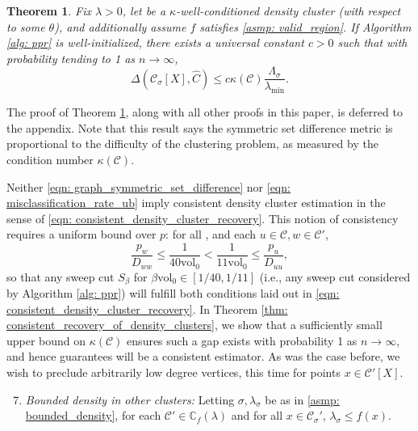 \documentclass{article}
\newcommand{\vol}{\mathrm{vol}}
\newcommand{\1}{\mathbf{1}}
\newcommand{\pbf}{p}        %
\newcommand{\Xbf}{X}             %
\newcommand{\Dbf}{D}
\newcommand{\Cbb}{\mathbb{C}}
\newcommand{\Cset}{\mathcal{C}}
\newcommand{\Csig}{\Cset_{\sigma}}
\newcommand{\Cest}{\widehat{C}}
\theoremstyle{aldenthm}
\newtheorem{theorem}{Theorem}
\theoremstyle{aldenrmrk}
\begin{document}
\begin{theorem}
  \label{thm: misclassification_rate}
  Fix $\lambda > 0$, let \smash{$\Cset \in \Cbb_f(\lambda)$} be a
  $\kappa$-well-conditioned density cluster (with respect to some $\theta$), and
  additionally assume $f$ satisfies \ref{asmp: valid_region}. If Algorithm
  \ref{alg: ppr} is well-initialized, there exists a universal constant $c >
  0$ such that with probability tending to 1 as $n \to \infty$,  
  \begin{equation}
    \label{eqn: misclassification_rate_ub}
    \Delta(\Csig[\Xbf], \Cest) \leq c \kappa(\Cset)
    \frac{\Lambda_{\sigma}}{\lambda_{\min}}. 
  \end{equation}
\end{theorem}

The proof of Theorem \ref{thm: misclassification_rate}, along with all other
proofs in this paper, is deferred to the appendix. Note that this 
result says the symmetric set difference metric \smash{$\Delta(\Csig[\Xbf],
  \Cest)$} is proportional to the difficulty of the clustering problem, as
measured by the condition number $\kappa(\Cset)$. 

Neither \eqref{eqn: graph_symmetric_set_difference} nor \eqref{eqn:
  misclassification_rate_ub} imply consistent density cluster estimation in the 
sense of \eqref{eqn: consistent_density_cluster_recovery}. This notion of
consistency requires a uniform bound over $\pbf$: for all \smash{$\Cset'
  \in \Cbb_f(\lambda), \Cset' \neq \Cset$}, and each $u \in \Cset, w \in
\Cset'$,  
\begin{equation}
\label{eqn: ppr_gap}
\frac{p_{w}}{\Dbf_{ww}} \leq \frac{1}{40\vol_0} < \frac{1}{11\vol_0} \leq
\frac{p_u}{\Dbf_{uu}}, 
\end{equation}
so that any sweep cut $S_{\beta}$ for $\beta \vol_0 \in [1/40,1/11]$ (i.e., any
sweep cut considered by Algorithm \ref{alg: ppr}) will fulfill both conditions
laid out in \eqref{eqn: consistent_density_cluster_recovery}. In Theorem
\ref{thm: consistent_recovery_of_density_clusters}, we show that a sufficiently
small upper bound on $\kappa(\Cset)$ ensures such a gap exists with probability
1 as $n \to \infty$, and hence guarantees \smash{$\Cest$} will be a consistent  
estimator. As was the case before, we wish to preclude arbitrarily low degree
vertices, this time for points $x \in \Cset'[\Xbf]$. 
\begin{enumerate}[label=(A\arabic*)]
  \setcounter{enumi}{6}
\item 
  \label{asmp: C'_bounded_density}
  \emph{Bounded density in other clusters:} Letting $\sigma,\lambda_{\sigma}$ be 
  as in \ref{asmp: bounded_density}, for each $\Cset' \in \Cbb_f(\lambda)$ and
  for all $x \in \Csig'$, $\lambda_{\sigma} \leq f(x)$. 
\end{enumerate}
\end{document}
